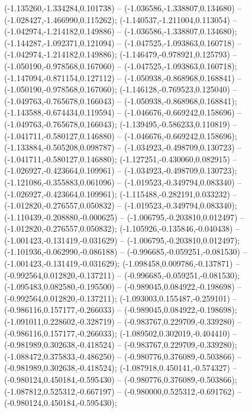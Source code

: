  (-1.135260,-1.334284,0.101738) -- (-1.036586,-1.338807,0.134680) -- (-1.028427,-1.466990,0.115262);
 (-1.140537,-1.211004,0.113054) -- (-1.042974,-1.214182,0.149886) -- (-1.036586,-1.338807,0.134680);
 (-1.144287,-1.092371,0.121094) -- (-1.047525,-1.093863,0.160718) -- (-1.042974,-1.214182,0.149886);
 (-1.146479,-0.978921,0.125793) -- (-1.050190,-0.978568,0.167060) -- (-1.047525,-1.093863,0.160718);
 (-1.147094,-0.871154,0.127112) -- (-1.050938,-0.868968,0.168841) -- (-1.050190,-0.978568,0.167060);
 (-1.146128,-0.769523,0.125040) -- (-1.049763,-0.765678,0.166043) -- (-1.050938,-0.868968,0.168841);
 (-1.143588,-0.674434,0.119594) -- (-1.046676,-0.669242,0.158696) -- (-1.049763,-0.765678,0.166043);
 (-1.139495,-0.586233,0.110819) -- (-1.041711,-0.580127,0.146880) -- (-1.046676,-0.669242,0.158696);
 (-1.133884,-0.505208,0.098787) -- (-1.034923,-0.498709,0.130723) -- (-1.041711,-0.580127,0.146880);
 (-1.127251,-0.430060,0.082915) -- (-1.026927,-0.423664,0.109961) -- (-1.034923,-0.498709,0.130723);
 (-1.121086,-0.355883,0.061096) -- (-1.019523,-0.349794,0.083340) -- (-1.026927,-0.423664,0.109961);
 (-1.115488,-0.282191,0.033232) -- (-1.012820,-0.276557,0.050832) -- (-1.019523,-0.349794,0.083340);
 (-1.110439,-0.208880,-0.000625) -- (-1.006795,-0.203810,0.012497) -- (-1.012820,-0.276557,0.050832);
 (-1.105926,-0.135846,-0.040438) -- (-1.001423,-0.131419,-0.031629) -- (-1.006795,-0.203810,0.012497);
 (-1.101936,-0.062990,-0.086188) -- (-0.996685,-0.059251,-0.081530) -- (-1.001423,-0.131419,-0.031629);
 (-1.098458,0.009786,-0.137871) -- (-0.992564,0.012820,-0.137211) -- (-0.996685,-0.059251,-0.081530);
 (-1.095483,0.082580,-0.195500) -- (-0.989045,0.084922,-0.198698) -- (-0.992564,0.012820,-0.137211);
 (-1.093003,0.155487,-0.259101) -- (-0.986116,0.157177,-0.266033) -- (-0.989045,0.084922,-0.198698);
 (-1.091011,0.228602,-0.328719) -- (-0.983767,0.229709,-0.339280) -- (-0.986116,0.157177,-0.266033);
 (-1.089502,0.302019,-0.404410) -- (-0.981989,0.302638,-0.418524) -- (-0.983767,0.229709,-0.339280);
 (-1.088472,0.375833,-0.486250) -- (-0.980776,0.376089,-0.503866) -- (-0.981989,0.302638,-0.418524);
 (-1.087918,0.450141,-0.574327) -- (-0.980124,0.450184,-0.595430) -- (-0.980776,0.376089,-0.503866);
 (-1.087812,0.525312,-0.667197) -- (-0.980000,0.525312,-0.691762) -- (-0.980124,0.450184,-0.595430);
